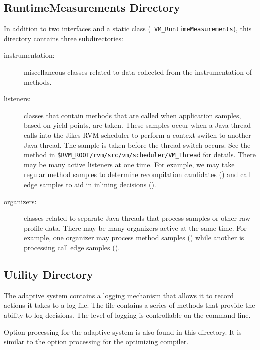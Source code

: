 \subsection{RuntimeMeasurements Directory}
In addition to two interfaces and a static class ({\tt
VM\_RuntimeMeasurements}),
this directory contains three subdirectories:
\begin{description}
\item [instrumentation:] miscellaneous classes related to
data collected from the instrumentation of methods.  

\item [listeners:] classes that contain methods that 
are called when application samples,
based on yield points, are taken.  These samples occur when a Java
thread calls into the Jikes RVM scheduler to perform a context switch
to another Java thread.  The sample is taken before the thread switch occurs.
See the 
 method in
{\tt \$RVM\_ROOT/rvm/src/vm/scheduler/VM\_Thread} for details.
There may be many active listeners at one
time.  For example, we may take regular method samples to determine
recompilation candidates () and call edge 
samples to aid in inlining decisions ().  

\item [organizers:]  classes related to separate Java threads that
process samples or other raw profile data.  There may be many
organizers active at the same time.
For example, one organizer may process method samples 
() while
another is processing 
call edge samples (). 
\end{description}

\JikesTMFooter

\subsection{Utility Directory}
The adaptive system contains a logging mechanism that allows it to
record actions it takes to a log file.  The file  
contains a series of methods that provide the ability to log
decisions.  The level of logging is controllable on the command line.

Option processing for the adaptive system is also found in this
directory.  It is similar to the option processing for the optimizing
compiler.



